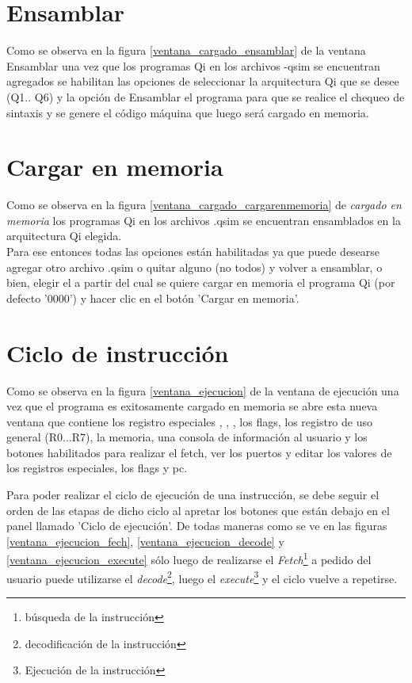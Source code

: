 \section{Ensamblar}
Como se observa en la figura \ref{ventana_cargado_ensamblar} de la ventana Ensamblar una vez que los programas Qi en los archivos -qsim se encuentran agregados se habilitan las opciones de seleccionar la arquitectura Qi que se desee (Q1.. Q6) y la opción de Ensamblar el programa para que se realice el chequeo de sintaxis y se genere el código máquina que luego será cargado en memoria.


\section{Cargar en memoria}
Como se observa en la figura \ref{ventana_cargado_cargarenmemoria} de \textit{cargado en memoria} los programas Qi en los archivos .qsim se encuentran ensamblados en la arquitectura Qi elegida.\\
Para ese entonces todas las opciones están habilitadas ya que puede desearse agregar otro archivo .qsim o quitar alguno (no todos) y volver a ensamblar, o bien, elegir el \PC a partir del cual se quiere cargar en memoria el programa Qi (por defecto '0000') y hacer clic en el botón 'Cargar en memoria'.

\section{Ciclo de instrucción}
Como se observa en la figura \ref{ventana_ejecucion} de la ventana de ejecución una vez que el programa es exitosamente cargado en memoria se abre esta nueva ventana que contiene los registro especiales \PC, \IR, \SP, los flags, los registro de uso general (R0...R7), la memoria, una consola de información al usuario y los botones habilitados para realizar el fetch, ver los puertos y editar los valores de los registros especiales, los flags y pc.


Para poder realizar el ciclo de ejecución de una instrucción, se debe seguir el orden de las etapas de dicho ciclo al apretar los botones que están debajo en el panel llamado 'Ciclo de ejecución'. De todas maneras como se ve en las figuras \ref{ventana_ejecucion_fech}, \ref{ventana_ejecucion_decode} y \ref{ventana_ejecucion_execute} sólo luego de realizarse el \textit{Fetch}\footnote{búsqueda de la instrucción} a pedido del usuario puede utilizarse el \textit{decode}\footnote{decodificación de la instrucción}, luego el \textit{execute}\footnote{Ejecución de la instrucción} y el ciclo vuelve a repetirse.\\

